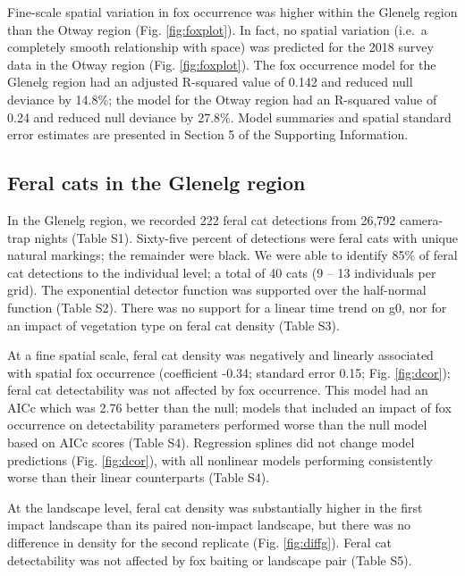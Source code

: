 \documentclass[]{elsarticle} %
\begin{document}
Fine-scale spatial variation in fox occurrence was higher within the Glenelg region than the Otway region (Fig. \ref{fig:foxplot}). In fact, no spatial variation (i.e.~a completely smooth relationship with space) was predicted for the 2018 survey data in the Otway region (Fig. \ref{fig:foxplot}). The fox occurrence model for the Glenelg region had an adjusted R-squared value of 0.142 and reduced null deviance by 14.8\%; the model for the Otway region had an R-squared value of 0.24 and reduced null deviance by 27.8\%. Model summaries and spatial standard error estimates are presented in Section 5 of the Supporting Information.

\hypertarget{feral-cats-in-the-glenelg-region}{%
\subsection{Feral cats in the Glenelg region}\label{feral-cats-in-the-glenelg-region}}

In the Glenelg region, we recorded 222 feral cat detections from 26,792 camera-trap nights (Table S1). Sixty-five percent of detections were feral cats with unique natural markings; the remainder were black. We were able to identify 85\% of feral cat detections to the individual level; a total of 40 cats (9 -- 13 individuals per grid). The exponential detector function was supported over the half-normal function (Table S2). There was no support for a linear time trend on g0, nor for an impact of vegetation type on feral cat density (Table S3).

At a fine spatial scale, feral cat density was negatively and linearly associated with spatial fox occurrence (coefficient -0.34; standard error 0.15; Fig. \ref{fig:dcor}); feral cat detectability was not affected by fox occurrence. This model had an AICc which was 2.76 better than the null; models that included an impact of fox occurrence on detectability parameters performed worse than the null model based on AICc scores (Table S4). Regression splines did not change model predictions (Fig. \ref{fig:dcor}), with all nonlinear models performing consistently worse than their linear counterparts (Table S4).

At the landscape level, feral cat density was substantially higher in the first impact landscape than its paired non-impact landscape, but there was no difference in density for the second replicate (Fig. \ref{fig:diffg}). Feral cat detectability was not affected by fox baiting or landscape pair (Table S5).
\end{document}
